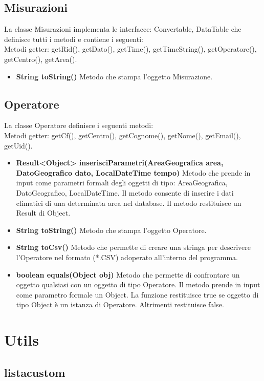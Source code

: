 \documentclass[a4paper, 12pt]{report}
\begin{document}
			\subsection{Misurazioni}
			La classe Misurazioni implementa le interfacce: Convertable, DataTable che definisce tutti i metodi e contiene i seguenti:\\
			Metodi getter: getRid(), getDato(), getTime(), getTimeString(), getOperatore(), getCentro(), getArea().
			\begin{itemize}
			\item \textbf{String toString()}
			Metodo che stampa l'oggetto Misurazione.
			\end{itemize}
			
			\subsection{Operatore}
			La classe Operatore definisce i seguenti metodi:\\
			Metodi getter: getCf(), getCentro(), getCognome(), getNome(), getEmail(), getUid().
			\begin{itemize}
			\item \textbf{Result<Object> inserisciParametri(AreaGeografica area, DatoGeografico dato, LocalDateTime tempo)}	
			Metodo che prende in input come parametri formali degli oggetti di tipo: AreaGeografica, DatoGeografico, LocalDateTime.
			Il metodo consente di inserire i dati climatici di una determinata area nel database. Il metodo restituisce un Result di Object.
			\item \textbf{String toString()}
			Metodo che stampa l'oggetto Operatore.	
			\item \textbf{String toCsv()}	
			Metodo che permette di creare una stringa per descrivere l'Operatore nel formato (*.CSV) adoperato all'interno del programma.
			\item \textbf{boolean equals(Object obj)}	
			Metodo che permette di confrontare un oggetto qualsiasi con un oggetto di tipo Operatore. Il metodo prende in input come parametro formale un Object. La funzione restituisce true se oggetto di tipo Object è un istanza di Operatore. Altrimenti restituisce false. 
			
			\end{itemize}

		\section{Utils}
			\subsection{listacustom}
\end{document}
